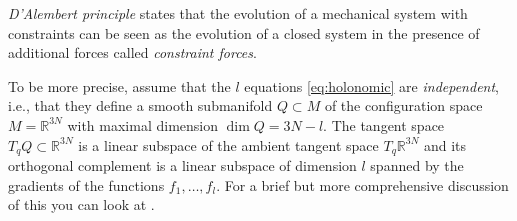 \documentclass[english,fontsize=11pt,paper=b5]{scrbook}
\numberwithin{equation}{chapter}
\theoremstyle{definition}
\begin{document}
    \begin{tcolorbox}
      \emph{D'Alembert principle} states that the evolution of a mechanical system with constraints can be seen as the evolution of a closed system in the presence of additional forces called \emph{constraint forces}.
    \end{tcolorbox}

    To be more precise, assume that the $l$ equations \eqref{eq:holonomic} are \emph{independent}, i.e., that they define a smooth submanifold $Q\subset M$ of the configuration space $M=\mathbb{R}^{3N}$ with maximal dimension $\dim Q = 3N-l$.
    The tangent space $T_qQ \subset \mathbb{R}^{3N}$ is a linear subspace of the ambient tangent space $T_q \mathbb{R}^{3N}$ and its orthogonal complement is a linear subspace of dimension $l$ spanned by the gradients of the functions $f_1, \ldots, f_l$.
    For a brief but more comprehensive discussion of this you can look at \cite[Chapter 2.8]{lectures:aom:seri}.
\end{document}
